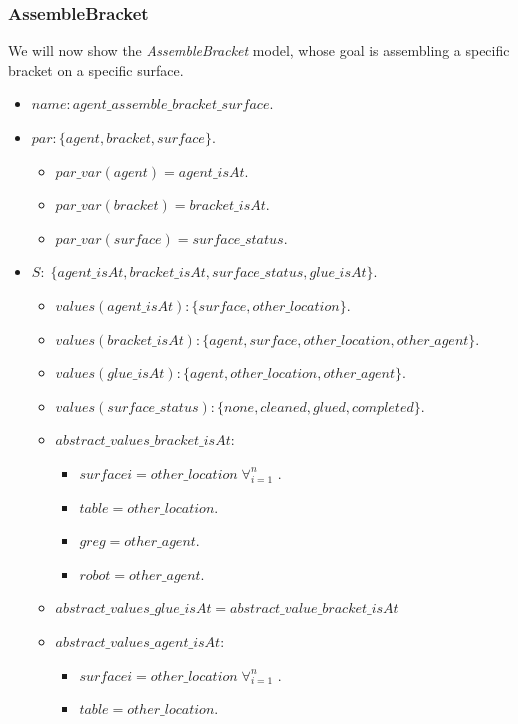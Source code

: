 \subsubsection{AssembleBracket}
We will now show the \textit{AssembleBracket} model, whose goal is assembling a specific bracket on a specific surface.
\begin{itemize}
	\item $name: agent\_assemble\_bracket\_surface$.
	\item		$par: \{agent,bracket,surface\}$.
		\begin{itemize}
			\item $par\_var(agent)=agent\_isAt$.
			\item $par\_var(bracket)=bracket\_isAt$.
			\item $par\_var(surface)=surface\_status$.
		\end{itemize}

	\item $S:\;\{agent\_isAt,bracket\_isAt,surface\_status,glue\_isAt\}$. 
		\begin{itemize}
			\item $values(agent\_isAt):\{surface,other\_location\}$.
			\item $values(bracket\_isAt):\{agent,surface, other\_location,other\_agent\}$. 
			\item $values(glue\_isAt):\{agent,other\_location,other\_agent\}$. 
			\item $values(surface\_status):\{none,cleaned,glued,completed\}$.
		\end{itemize}
		\begin{itemize}
			\item $abstract\_values\_bracket\_isAt$: 
				\begin{itemize}
					\item $surfacei=other\_location\; \forall_{i=1}^n$ .
					\item $table=other\_location$.
					\item $greg=other\_agent$.
					\item $robot=other\_agent$.
				\end{itemize}	
			\item $abstract\_values\_glue\_isAt=abstract\_value\_bracket\_isAt$ 
			\item $abstract\_values\_agent\_isAt$:
				\begin{itemize}
					\item $surfacei=other\_location\; \forall_{i=1}^n$ .
					\item $table=other\_location$.
				\end{itemize}
		\end{itemize}
		

\end{itemize}
